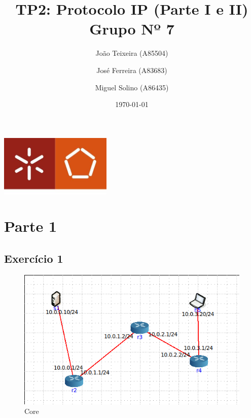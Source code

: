 \documentclass[a4paper]{report}
\begin{document}
\title{TP2:  Protocolo IP (Parte I e II)\\ 
\large Grupo Nº 7}
\author{João Teixeira (A85504) \and José Ferreira (A83683) \and Miguel Solino (A86435)}

\date{\today}

\begin{center}
    \begin{minipage}{0.75\linewidth}
        \centering
        \includegraphics[width=0.4\textwidth]{images/eng.jpeg}\par\vspace{1cm}
        \vspace{1cm}
        \href{https://www.uminho.pt/PT}
        {\color{black}{\scshape\LARGE Universidade do Minho}} \par
        \vspace{1cm}
        \href{https://www.di.uminho.pt/}
        {\color{black}{\scshape\Large Departamento de Informática}} \par
        \maketitle
    \end{minipage}
\end{center}

\tableofcontents

\pagebreak
\chapter{Parte 1}
\section{Exercício 1}

\begin{figure}[H]
    \centering 
    \includegraphics[width=\textwidth]{images/coreEx1.png}  
    \caption{Core}
    \label{fig:coreEx1}
\end{figure}
\end{document}
